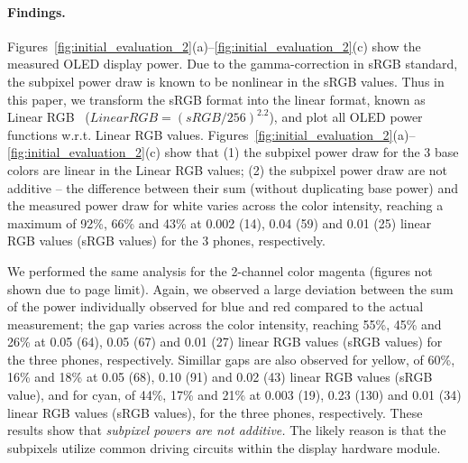 \paragraph{Findings.}
{
Figures~\ref{fig:initial_evaluation_2}(a)--\ref{fig:initial_evaluation_2}(c)
show the measured OLED display power. Due to the gamma-correction in sRGB standard,
the subpixel power draw is known to be nonlinear in the sRGB values.
Thus in this paper, we transform the sRGB format into the linear format, known as Linear RGB~\cite{gammaCorrection1} ({$Linear RGB = (sRGB/256)^{2.2}$}),
and plot all OLED power functions w.r.t. Linear RGB values.
Figures~\ref{fig:initial_evaluation_2}(a)--\ref{fig:initial_evaluation_2}(c) show that
(1) the subpixel power draw for the 3 base colors are linear in the Linear RGB values;
(2) the subpixel power draw are not additive -- 
the difference between their sum (without duplicating base power)
and the measured power draw for white
varies across the color intensity, reaching
a maximum of 92\%, 66\% and 43\% at
0.002 (14), 0.04 (59) and 0.01 (25) linear RGB values (sRGB values) for the 3 phones, respectively.


We performed the same analysis for the 2-channel color magenta
(figures not shown due to page limit). Again, we
observed a large deviation between the sum of the power individually observed for blue and
red compared to the actual measurement; the gap
varies across the color intensity, reaching
55\%, 45\% and 26\% at 0.05 (64), 0.05 (67) and 0.01 (27) linear RGB values (sRGB values)
for the three phones, respectively.
Simillar gaps are also observed for yellow, \eg of
60\%, 16\% and 18\% at 0.05 (68), 0.10 (91) and 0.02 (43) linear RGB values (sRGB value),
and for cyan, of
44\%, 17\% and 21\% at 0.003 (19), 0.23 (130) and 0.01 (34) linear RGB values (sRGB values),
for the three phones, respectively.
These results show that
%
{\em subpixel powers are not additive.} The likely reason is that the
  subpixels utilize common driving circuits within the display
  hardware module.
}
  
